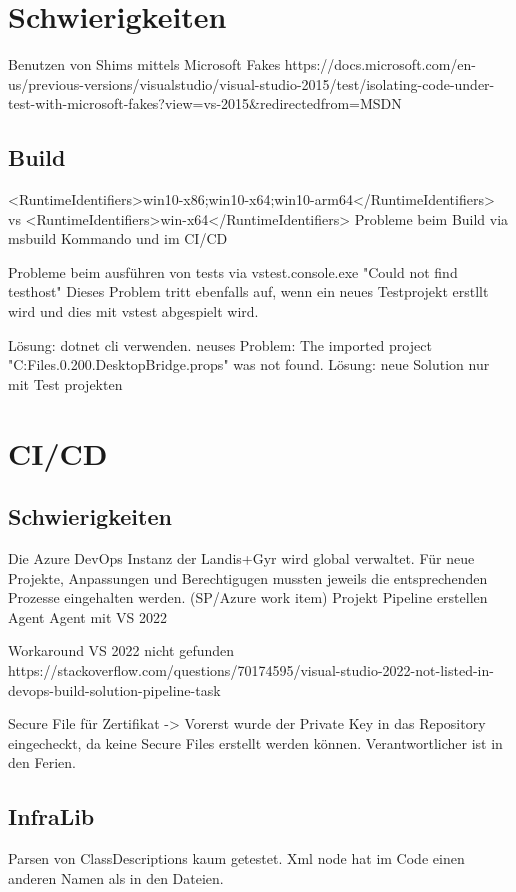 

\section{Schwierigkeiten}
Benutzen von Shims mittels Microsoft Fakes
https://docs.microsoft.com/en-us/previous-versions/visualstudio/visual-studio-2015/test/isolating-code-under-test-with-microsoft-fakes?view=vs-2015&redirectedfrom=MSDN

\subsection{Build}
<RuntimeIdentifiers>win10-x86;win10-x64;win10-arm64</RuntimeIdentifiers> vs <RuntimeIdentifiers>win-x64</RuntimeIdentifiers>
Probleme beim Build via msbuild Kommando und im CI/CD

Probleme beim ausführen von tests via vstest.console.exe
"Could not find testhost"
Dieses Problem tritt ebenfalls auf, wenn ein neues Testprojekt erstllt wird und dies mit vstest abgespielt wird.

Lösung:
dotnet cli verwenden. neuses Problem:  The imported project "C:\Program Files\dotnet\sdk\6.0.200\Microsoft\DesktopBridge\Microsoft.DesktopBridge.props" was not found.
Lösung:
neue Solution nur mit Test projekten

\section{CI/CD}

\subsection{Schwierigkeiten}
Die Azure DevOps Instanz der Landis+Gyr wird global verwaltet. Für neue Projekte, Anpassungen und Berechtigugen mussten jeweils die entsprechenden Prozesse eingehalten werden. (SP/Azure work item)
Projekt
Pipeline erstellen
Agent
Agent mit VS 2022

Workaround VS 2022 nicht gefunden
https://stackoverflow.com/questions/70174595/visual-studio-2022-not-listed-in-devops-build-solution-pipeline-task

Secure File für Zertifikat
-> Vorerst wurde der Private Key in das Repository eingecheckt, da keine Secure Files erstellt werden können. Verantwortlicher ist in den Ferien.


\subsection{InfraLib}
Parsen von ClassDescriptions kaum getestet. Xml node hat im Code einen anderen Namen als in den Dateien.

